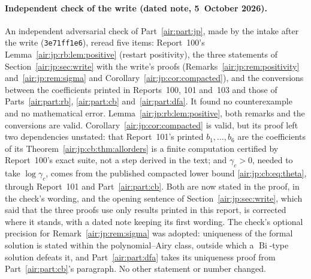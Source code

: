 \documentclass[11pt,letterpaper]{article}
\numberwithin{equation}{section}
\theoremstyle{remark}
\begin{document}
\paragraph{Independent check of the write (dated note, 5~October 2026).}
An independent adversarial check of Part~\ref{air:part:jp}, made by the intake after the write (\texttt{3e71ff1e6}), reread five items: Report~100's Lemma~\ref{air:jp:rb:lem:positive} (restart positivity), the three statements of Section~\ref{air:jp:sec:write} with the write's proofs (Remarks~\ref{air:jp:rem:positivity} and~\ref{air:jp:rem:sigma} and Corollary~\ref{air:jp:cor:compacted}), and the conversions between the coefficients printed in Reports~100, 101 and~103 and those of Parts~\ref{air:part:rb}, \ref{air:part:cb} and~\ref{air:part:dfa}. It found no counterexample and no mathematical error. Lemma~\ref{air:jp:rb:lem:positive}, both remarks and the conversions are valid. Corollary~\ref{air:jp:cor:compacted} is valid, but its proof left two dependencies unstated: that Report~101's printed $b_1,\ldots,b_6$ are the coefficients of its Theorem~\ref{air:jp:cb:thm:allorders} is a finite computation certified by Report~100's exact suite, not a step derived in the text; and $\gamma_c>0$, needed to take $\log\gamma_c$, comes from the published compacted lower bound \eqref{air:jp:cb:eq:theta}, through Report~101 and Part~\ref{air:part:cb}. Both are now stated in the proof, in the check's wording, and the opening sentence of Section~\ref{air:jp:sec:write}, which said that the three proofs use only results printed in this report, is corrected where it stands, with a dated note keeping its first wording. The check's optional precision for Remark~\ref{air:jp:rem:sigma} was adopted: uniqueness of the formal solution is stated within the polynomial--Airy class, outside which a $\operatorname{Bi}$-type solution defeats it, and Part~\ref{air:part:dfa} takes its uniqueness proof from Part~\ref{air:part:cb}'s paragraph. No other statement or number changed.
\end{document}
